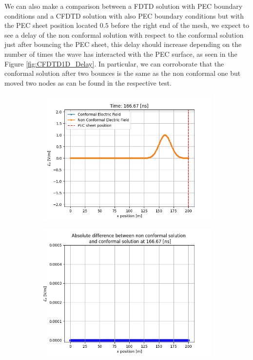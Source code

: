 \documentclass[12pt, oneside]{book}
\begin{document}
We can also make a comparison between a FDTD solution with PEC boundary conditions and a CFDTD solution with also PEC boundary conditions but with the PEC sheet position located $0.5$ before the right end of the mesh, we expect to see a delay of the non conformal solution with respect to the conformal solution just after bouncing the PEC sheet, this delay should increase depending on the number of times the wave has interacted with the PEC surface, as seen in the Figure \ref{fig:CFDTD1D_Delay}. In particular, we can corroborate that the conformal solution after two bounces is the same as the non conformal one but moved two nodes as can be found in the respective test. 

\begin{figure}[H]
    \centering
    \begin{subfigure}[b]{0.45\textwidth}
        \centering
        \includegraphics[width=\textwidth]{Imagenes/CFDTD1D_Comparison1.png}
    \end{subfigure}
    \begin{subfigure}[b]{0.45\textwidth}
        \centering
        \includegraphics[width=\textwidth]{Imagenes/CFDTD1D_DelayDifference1.png}
    \end{subfigure}


\end{figure}
\end{document}
